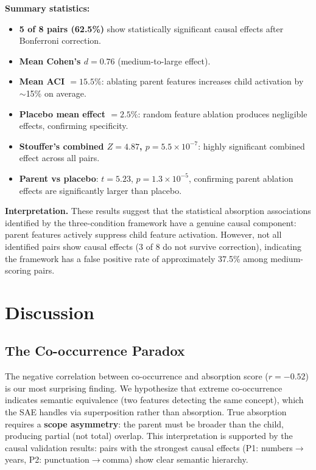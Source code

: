 \documentclass{article}
\begin{document}
\textbf{Summary statistics:}
\begin{itemize}
    \item \textbf{5 of 8 pairs (62.5\%)} show statistically significant causal effects after Bonferroni correction.
    \item \textbf{Mean Cohen's $d = 0.76$} (medium-to-large effect).
    \item \textbf{Mean ACI $= 15.5\%$}: ablating parent features increases child activation by $\sim$15\% on average.
    \item \textbf{Placebo mean effect $= 2.5\%$}: random feature ablation produces negligible effects, confirming specificity.
    \item \textbf{Stouffer's combined $Z = 4.87$, $p = 5.5\times10^{-7}$}: highly significant combined effect across all pairs.
    \item \textbf{Parent vs placebo}: $t = 5.23$, $p = 1.3\times10^{-5}$, confirming parent ablation effects are significantly larger than placebo.
\end{itemize}

\textbf{Interpretation.} These results suggest that the statistical absorption associations identified by the three-condition framework have a genuine causal component: parent features actively suppress child feature activation. However, not all identified pairs show causal effects (3 of 8 do not survive correction), indicating the framework has a false positive rate of approximately 37.5\% among medium-scoring pairs.

\section{Discussion}
\label{sec:discussion}

\subsection{The Co-occurrence Paradox}
\label{subsec:cooc-paradox}

The negative correlation between co-occurrence and absorption score ($r=-0.52$) is our most surprising finding. We hypothesize that extreme co-occurrence indicates semantic equivalence (two features detecting the same concept), which the SAE handles via superposition rather than absorption. True absorption requires a \textbf{scope asymmetry}: the parent must be broader than the child, producing partial (not total) overlap. This interpretation is supported by the causal validation results: pairs with the strongest causal effects (P1: numbers$\rightarrow$years, P2: punctuation$\rightarrow$comma) show clear semantic hierarchy.
\end{document}
